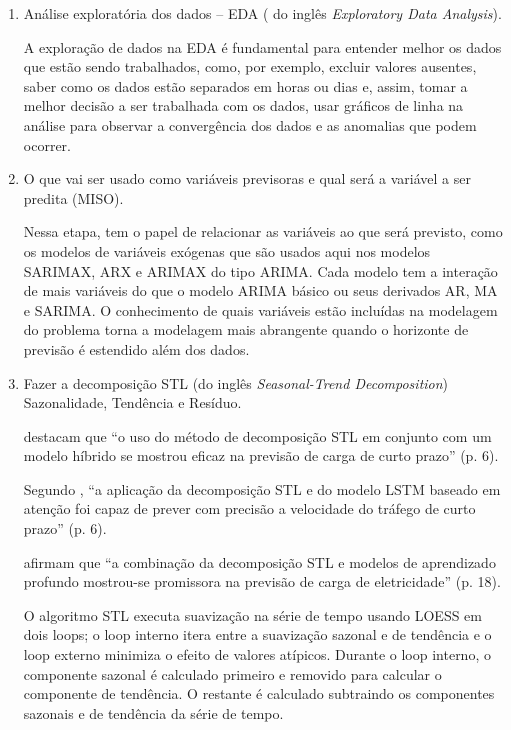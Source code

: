     \begin{enumerate}[start=1, label = {\textbf{Etapa} \arabic*} ]
    	\item Análise exploratória dos dados – EDA ( do inglês \textit{Exploratory Data Analysis}). \label{etp:1}
    	
    	A exploração de dados na EDA é fundamental para entender melhor os dados que estão sendo trabalhados, como, por exemplo, excluir valores ausentes, saber como os dados estão separados em horas ou dias e, assim, tomar a melhor decisão a ser trabalhada com os dados, usar gráficos de linha na análise para observar a convergência dos dados e as anomalias que podem ocorrer.
    	
        	
    	\item O que vai ser usado como variáveis previsoras e qual será a variável a ser predita (MISO). \label{etp:2}
    	
    	Nessa etapa, tem o papel de relacionar as variáveis ao que será previsto, como os modelos de variáveis exógenas que são usados aqui nos modelos SARIMAX, ARX e ARIMAX do tipo ARIMA. Cada modelo tem a interação de mais variáveis do que o modelo ARIMA básico ou seus derivados AR, MA e SARIMA. O conhecimento de quais variáveis estão incluídas na modelagem do problema torna a modelagem mais abrangente quando o horizonte de previsão é estendido além dos dados.
    	
       	
    	\item Fazer a decomposição STL (do inglês \textit{Seasonal-Trend Decomposition}) Sazonalidade, Tendência e Resíduo. \label{etp:3}
    	
    	 destacam que ``o uso do método de decomposição STL em conjunto com um modelo híbrido se mostrou eficaz na previsão de carga de curto prazo'' (p. 6).
    	
    	Segundo , ``a aplicação da decomposição STL e do modelo LSTM baseado em atenção foi capaz de prever com precisão a velocidade do tráfego de curto prazo'' (p. 6).
    	
    	 afirmam que ``a combinação da decomposição STL e modelos de aprendizado profundo mostrou-se promissora na previsão de carga de eletricidade'' (p. 18).
    	
        O algoritmo STL executa suavização na série de tempo usando LOESS em dois loops; o loop interno itera entre a suavização sazonal e de tendência e o loop externo minimiza o efeito de valores atípicos. Durante o loop interno, o componente sazonal é calculado primeiro e removido para calcular o componente de tendência. O restante é calculado subtraindo os componentes sazonais e de tendência da série de tempo.
        

\end{enumerate}
